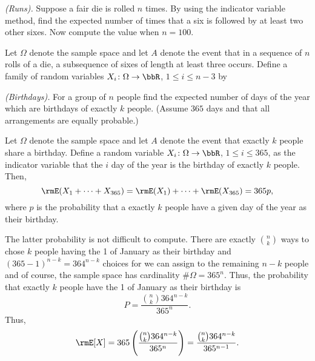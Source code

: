 \begin{problem}[Handout 6, \# 9]
  \emph{(Runs).} Suppose a fair die is rolled \(n\) times. By using the
  indicator variable method, find the expected number of times that a six
  is followed by at least two other sixes. Now compute the value when
  \(n=100\).
\end{problem}
\begin{solution}
  Let \(\Omega\) denote the sample space and let \(A\) denote the event
  that in a sequence of \(n\) rolls of a die, a subsequence of sixes of
  length at least three occurs. Define a family of random variables
  \(X_i\colon\Omega\to\bbR\), \(1\leq i\leq n-3\) by
\end{solution}
\newpage

\begin{problem}[Handout 6, \# 10]
  \emph{(Birthdays).} For a group of \(n\) people find the expected number
  of days of the year which are birthdays of exactly \(k\) people. (Assume
  \(365\) days and that all arrangements are equally probable.)
\end{problem}
\begin{solution}
  Let \(\Omega\) denote the sample space and let \(A\) denote the event
  that exactly \(k\) people share a birthday. Define a random variable
  \(X_i\colon\Omega\to\bbR\), \(1\leq i\leq 365\), as the indicator
  variable that the \(i\) day of the year is the birthday of
  exactly \(k\) people. Then,
  \[
    \rmE(X_1+\dotsb+X_{365})=\rmE(X_1)+\dotsb+\rmE(X_{365})=365p,
  \]
  where \(p\) is the probability that a exactly \(k\) people have a given
  day of the year as their birthday.

  The latter probability is not difficult to compute. There are exactly
  \(\binom{n}{k}\) ways to chose \(k\) people having the 1 of
  January as their birthday and \((365-1)^{n-k}=364^{n-k}\) choices for we
  can assign to the remaining \(n-k\) people and of course, the sample
  space has cardinality \(\#\Omega=365^n\). Thus, the probability that
  exactly \(k\) people have the 1 of January as their birthday
  is
  \[
    P=\frac{\binom{n}{k}364^{n-k}}{365^n}.
  \]
  Thus,
  \[
    \rmE[X]
    =365\left(\frac{\binom{n}{k}364^{n-k}}{365^n}\right)
    =\frac{\binom{n}{k}364^{n-k}}{365^{n-1}}.
  \]
\end{solution}
\newpage

